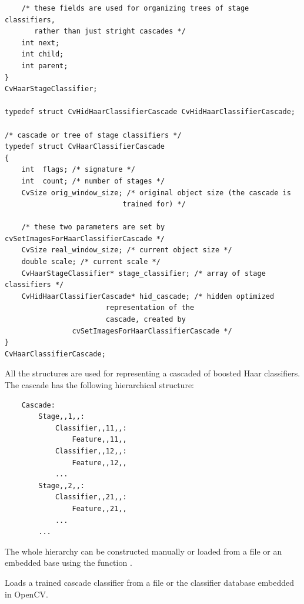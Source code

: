 \begin{lstlisting}
    /* these fields are used for organizing trees of stage classifiers,
       rather than just stright cascades */
    int next;
    int child;
    int parent;
}
CvHaarStageClassifier;

typedef struct CvHidHaarClassifierCascade CvHidHaarClassifierCascade;

/* cascade or tree of stage classifiers */
typedef struct CvHaarClassifierCascade
{
    int  flags; /* signature */
    int  count; /* number of stages */
    CvSize orig_window_size; /* original object size (the cascade is 
							trained for) */

    /* these two parameters are set by cvSetImagesForHaarClassifierCascade */
    CvSize real_window_size; /* current object size */
    double scale; /* current scale */
    CvHaarStageClassifier* stage_classifier; /* array of stage classifiers */
    CvHidHaarClassifierCascade* hid_cascade; /* hidden optimized 
						representation of the 
						cascade, created by 
				cvSetImagesForHaarClassifierCascade */
}
CvHaarClassifierCascade;
\end{lstlisting}

All the structures are used for representing a cascaded of boosted Haar classifiers. The cascade has the following hierarchical structure:

\begin{verbatim}
    Cascade:
        Stage,,1,,:
            Classifier,,11,,:
                Feature,,11,,
            Classifier,,12,,:
                Feature,,12,,
            ...
        Stage,,2,,:
            Classifier,,21,,:
                Feature,,21,,
            ...
        ...
\end{verbatim}

The whole hierarchy can be constructed manually or loaded from a file or an embedded base using the function .


\label{LoadHaarClassifierCascade}

Loads a trained cascade classifier from a file or the classifier database embedded in OpenCV.


\begin{description}
\end{description}

